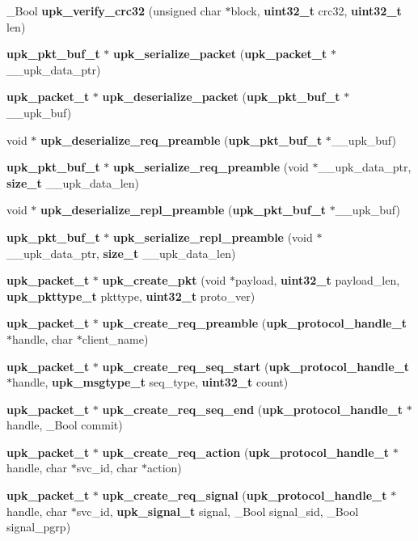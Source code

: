 \begin{DoxyCompactItemize}
\item 
\_\-Bool {\bf upk\_\-verify\_\-crc32} (unsigned char $\ast$block, {\bf uint32\_\-t} crc32, {\bf uint32\_\-t} len)
\item 
{\bf upk\_\-pkt\_\-buf\_\-t} $\ast$ {\bf upk\_\-serialize\_\-packet} ({\bf upk\_\-packet\_\-t} $\ast$\_\-\_\-upk\_\-data\_\-ptr)
\item 
{\bf upk\_\-packet\_\-t} $\ast$ {\bf upk\_\-deserialize\_\-packet} ({\bf upk\_\-pkt\_\-buf\_\-t} $\ast$\_\-\_\-upk\_\-buf)
\item 
void $\ast$ {\bf upk\_\-deserialize\_\-req\_\-preamble} ({\bf upk\_\-pkt\_\-buf\_\-t} $\ast$\_\-\_\-upk\_\-buf)
\item 
{\bf upk\_\-pkt\_\-buf\_\-t} $\ast$ {\bf upk\_\-serialize\_\-req\_\-preamble} (void $\ast$\_\-\_\-upk\_\-data\_\-ptr, {\bf size\_\-t} \_\-\_\-upk\_\-data\_\-len)
\item 
void $\ast$ {\bf upk\_\-deserialize\_\-repl\_\-preamble} ({\bf upk\_\-pkt\_\-buf\_\-t} $\ast$\_\-\_\-upk\_\-buf)
\item 
{\bf upk\_\-pkt\_\-buf\_\-t} $\ast$ {\bf upk\_\-serialize\_\-repl\_\-preamble} (void $\ast$\_\-\_\-upk\_\-data\_\-ptr, {\bf size\_\-t} \_\-\_\-upk\_\-data\_\-len)
\item 
{\bf upk\_\-packet\_\-t} $\ast$ {\bf upk\_\-create\_\-pkt} (void $\ast$payload, {\bf uint32\_\-t} payload\_\-len, {\bf upk\_\-pkttype\_\-t} pkttype, {\bf uint32\_\-t} proto\_\-ver)
\item 
{\bf upk\_\-packet\_\-t} $\ast$ {\bf upk\_\-create\_\-req\_\-preamble} ({\bf upk\_\-protocol\_\-handle\_\-t} $\ast$handle, char $\ast$client\_\-name)
\item 
{\bf upk\_\-packet\_\-t} $\ast$ {\bf upk\_\-create\_\-req\_\-seq\_\-start} ({\bf upk\_\-protocol\_\-handle\_\-t} $\ast$handle, {\bf upk\_\-msgtype\_\-t} seq\_\-type, {\bf uint32\_\-t} count)
\item 
{\bf upk\_\-packet\_\-t} $\ast$ {\bf upk\_\-create\_\-req\_\-seq\_\-end} ({\bf upk\_\-protocol\_\-handle\_\-t} $\ast$handle, \_\-Bool commit)
\item 
{\bf upk\_\-packet\_\-t} $\ast$ {\bf upk\_\-create\_\-req\_\-action} ({\bf upk\_\-protocol\_\-handle\_\-t} $\ast$handle, char $\ast$svc\_\-id, char $\ast$action)
\item 
{\bf upk\_\-packet\_\-t} $\ast$ {\bf upk\_\-create\_\-req\_\-signal} ({\bf upk\_\-protocol\_\-handle\_\-t} $\ast$handle, char $\ast$svc\_\-id, {\bf upk\_\-signal\_\-t} signal, \_\-Bool signal\_\-sid, \_\-Bool signal\_\-pgrp)
\item 

\end{DoxyCompactItemize}
